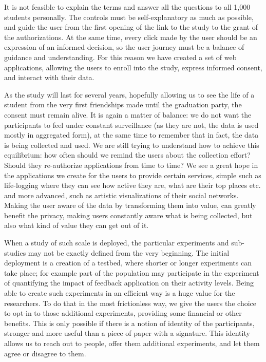 It is not feasible to explain the terms and answer all the questions to all 1,000 students personally.
The controls must be self-explanatory as much as possible, and guide the user from the first opening of the link to the study to the grant of the authorizations.
At the same time, every click made by the user should be an expression of an informed decision, so the user journey must be a balance of guidance and understanding.
For this reason we have created a set of web applications, allowing the users to enroll into the study, express informed consent, and interact with their data.

As the study will last for several years, hopefully allowing us to see the life of a student from the very first friendships made until the graduation party, the consent must remain alive.
It is again a matter of balance: we do not want the participants to feel under constant surveillance (as they are not, the data is used mostly in aggregated form), at the same time to remember that in fact, the data is being collected and used.
We are still trying to understand how to achieve this equilibrium: how often should we remind the users about the collection effort? Should they re-authorize applications from time to time?
We see a great hope in the applications we create for the users to provide certain services, simple such as life-logging where they can see how active they are, what are their top places etc. and more advanced, such as artistic visualizations of their social networks.
Making the user aware of the data by transforming them into value, can greatly benefit the privacy, making users constantly aware what is being collected, but also what kind of value they can get out of it.

When a study of such scale is deployed, the particular experiments and sub-studies may not be exactly defined from the very beginning.
The initial deployment is a creation of a testbed, where shorter or longer experiments can take place; for example part of the population may participate in the experiment of quantifying the impact of feedback application on their activity levels.
Being able to create such experiments in an efficient way is a huge value for the researchers. To do that in the most frictionless way, we give the users the choice to opt-in to those additional experiments, providing some financial or other benefits.
This is only possible if there is a notion of identity of the participants, stronger and more useful than a piece of paper with a signature.
This identity allows us to reach out to people, offer them additional experiments, and let them agree or disagree to them.

